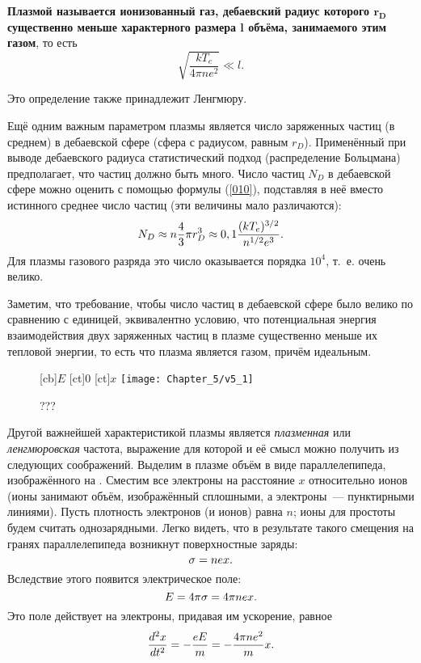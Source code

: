 {\bf Плазмой называется ионизованный газ, дебаевский радиус которого $\boldsymbol{r_D}$ существенно меньше характерного
размера $\boldsymbol{l}$ объёма, занимаемого этим газом}, то есть
\begin{equation*}
	\sqrt{\frac{kT_e}{4\pi ne^2}}\ll l.
\end{equation*}

Это определение также принадлежит Ленгмюру.

Ещё одним важным параметром плазмы является число заряженных частиц (в среднем) в дебаевской сфере (сфера с радиусом,
равным $r_D$). Применённый при выводе дебаевского радиуса статистический подход (распределение Больцмана) предполагает,
что частиц должно быть много. Число частиц $N_D$ в дебаевской сфере можно оценить с помощью формулы (\eqref{010}),
подставляя в неё вместо истинного среднее число частиц (эти величины мало различаются):
\begin{equation}
	\eqmark{41l}
	N_D\approx n\frac43\pi r_D^3\approx0,1\frac{(kT_e)^{3/2}}{n^{1/2}e^3}.
\end{equation}
Для плазмы газового разряда это число оказывается порядка $10^4$, т.~е. очень велико.

Заметим, что требование, чтобы число частиц в дебаевской сфере было велико по сравнению с единицей, эквивалентно
условию, что потенциальная энергия взаимодействия двух заряженных частиц в плазме существенно меньше их тепловой
энергии, то есть что плазма является газом, причём идеальным.

\begin{wrapfigure}{o}{0.3\textwidth}
	[cb]{$E$}
	[ct]{0}
	[ct]{$x$}
	\texttt{[image: Chapter\_5/v5\_1]}
	\caption{???}
\end{wrapfigure}

Другой важнейшей характеристикой плазмы является \textit{плазменная} или \textit{ленгмюровская} частота, выражение для
которой и её смысл можно получить из следующих соображений. Выделим в плазме объём в виде параллелепипеда, изображённого
на . Сместим все электроны на расстояние $x$ относительно ионов (ионы занимают объём, изображённый сплошными, а
электроны~--- пунктирными линиями). Пусть плотность электронов (и ионов) равна $n$; ионы для простоты будем считать
однозарядными. Легко видеть, что в результате такого смещения на гранях параллелепипеда возникнут поверхностные заряды:
\begin{equation}
	\eqmark{012}
	\sigma=nex.
\end{equation}
Вследствие этого появится электрическое поле:
\begin{equation}
	\eqmark{013}
	E=4\pi\sigma=4\pi nex.
\end{equation}
Это поле действует на электроны, придавая им ускорение, равное
\begin{equation}
	\eqmark{014}
	\frac{d^2x}{dt^2}=-\frac{eE}{m}=-\frac{4\pi ne^2}{m}x.
\end{equation}

